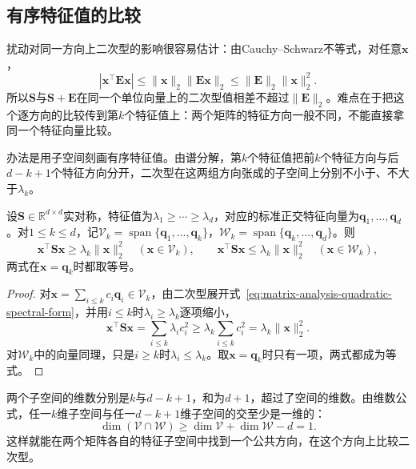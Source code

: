 \subsection{有序特征值的比较}

扰动对同一方向上二次型的影响很容易估计：由Cauchy--Schwarz不等式，对任意$\bm x$，
\[
 |\bm x^\top\bm E\bm x|\leq\lVert\bm x\rVert_2\lVert\bm E\bm x\rVert_2\leq\lVert\bm E\rVert_2\lVert\bm x\rVert_2^2 .
\]
所以$\bm S$与$\bm S+\bm E$在同一个单位向量上的二次型值相差不超过$\lVert\bm E\rVert_2$。难点在于把这个逐方向的比较传到第$k$个特征值上：两个矩阵的特征方向一般不同，不能直接拿同一个特征向量比较。

办法是用子空间刻画有序特征值。由谱分解，第$k$个特征值把前$k$个特征方向与后$d-k+1$个特征方向分开，二次型在这两组方向张成的子空间上分别不小于、不大于$\lambda_k$。

\begin{lemma}[特征子空间上的二次型界]
\label{lem:ls-eigen-subspace-quadratic-bounds}
\label{lem:ls-restricted-rayleigh}
设$\bm S\in\mathbb R^{d\times d}$实对称，特征值为$\lambda_1\geq\cdots\geq\lambda_d$，对应的标准正交特征向量为$\bm q_1,\ldots,\bm q_d$。对$1\leq k\leq d$，记$\mathcal V_k=\operatorname{span}\{\bm q_1,\ldots,\bm q_k\}$，$\mathcal W_k=\operatorname{span}\{\bm q_k,\ldots,\bm q_d\}$。则
\[
 \bm x^\top\bm S\bm x\geq\lambda_k\lVert\bm x\rVert_2^2\quad(\bm x\in\mathcal V_k),\qquad
 \bm x^\top\bm S\bm x\leq\lambda_k\lVert\bm x\rVert_2^2\quad(\bm x\in\mathcal W_k),
\]
两式在$\bm x=\bm q_k$时都取等号。
\end{lemma}
\begin{proof}
对$\bm x=\sum_{i\leq k}c_i\bm q_i\in\mathcal V_k$，由二次型展开式~\eqref{eq:matrix-analysis-quadratic-spectral-form}，并用$i\leq k$时$\lambda_i\geq\lambda_k$逐项缩小，
\[
 \bm x^\top\bm S\bm x=\sum_{i\leq k}\lambda_ic_i^2\geq\lambda_k\sum_{i\leq k}c_i^2=\lambda_k\lVert\bm x\rVert_2^2 .
\]
对$\mathcal W_k$中的向量同理，只是$i\geq k$时$\lambda_i\leq\lambda_k$。取$\bm x=\bm q_k$时只有一项，两式都成为等式。
\end{proof}

两个子空间的维数分别是$k$与$d-k+1$，和为$d+1$，超过了空间的维数。由维数公式，任一$k$维子空间与任一$d-k+1$维子空间的交至少是一维的：
\[
 \dim(\mathcal V\cap\mathcal W)\geq\dim\mathcal V+\dim\mathcal W-d=1 .
\]
这样就能在两个矩阵各自的特征子空间中找到一个公共方向，在这个方向上比较二次型。

